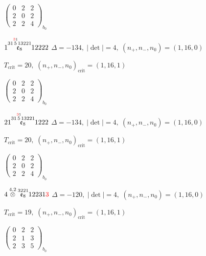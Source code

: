 \documentclass[10pt]{article}
\begin{document}
\hspace{2em}$\left(\begin{smallmatrix}0 & 2 & 2 \\ 2 & 0 & 2 \\ 2 & 2 & 4\end{smallmatrix}\right)_{\!b_0}$

\smallskip

$1\overset{31\overset{\textcolor{red}{3}1}{5}13221}{\mathfrak{e}_8}12222$ \quad $\Delta=-134,\; |\det|=4,\; (n_+,n_-,n_0)=(1,16,0)$

\hspace{1em}$T_{\text{crit}}=20,\; (n_+,n_-,n_0)_{\text{crit}}=(1,16,1)$

\hspace{2em}$\left(\begin{smallmatrix}0 & 2 & 2 \\ 2 & 0 & 2 \\ 2 & 2 & 4\end{smallmatrix}\right)_{\!b_0}$

\smallskip

$21\overset{31\overset{\textcolor{red}{3}1}{5}13221}{\mathfrak{e}_8}1222$ \quad $\Delta=-134,\; |\det|=4,\; (n_+,n_-,n_0)=(1,16,0)$

\hspace{1em}$T_{\text{crit}}=20,\; (n_+,n_-,n_0)_{\text{crit}}=(1,16,1)$

\hspace{2em}$\left(\begin{smallmatrix}0 & 2 & 2 \\ 2 & 0 & 2 \\ 2 & 2 & 4\end{smallmatrix}\right)_{\!b_0}$

\smallskip

$4\overset{4,2}{\otimes}\overset{3221}{\mathfrak{e}_8}12231\textcolor{red}{3}$ \quad $\Delta=-120,\; |\det|=4,\; (n_+,n_-,n_0)=(1,16,0)$

\hspace{1em}$T_{\text{crit}}=19,\; (n_+,n_-,n_0)_{\text{crit}}=(1,16,1)$

\hspace{2em}$\left(\begin{smallmatrix}0 & 2 & 2 \\ 2 & 1 & 3 \\ 2 & 3 & 5\end{smallmatrix}\right)_{\!b_0}$
\end{document}
